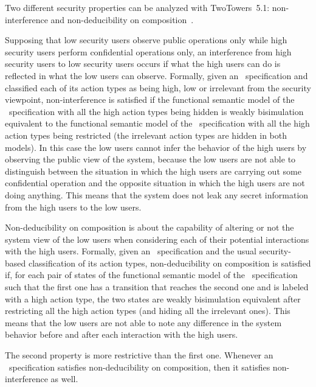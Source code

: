 Two different security properties can be analyzed with TwoTowers~5.1: non-interference and non-deducibility
on composition~\cite{FG}.

Supposing that low security users observe public operations only while high security users perform
confidential operations only, an interference from high security users to low security users occurs if what
the high users can do is reflected in what the low users can observe. Formally, given an \aemilia\
specification and classified each of its action types as being high, low or irrelevant from the security
viewpoint, non-interference is satisfied if the functional semantic model of the \aemilia\ specification
with all the high action types being hidden is weakly bisimulation equivalent to the functional semantic
model of the \aemilia\ specification with all the high action types being restricted (the irrelevant action
types are hidden in both models). In this case the low users cannot infer the behavior of the high users by
observing the public view of the system, because the low users are not able to distinguish between the
situation in which the high users are carrying out some confidential operation and the opposite situation in
which the high users are not doing anything. This means that the system does not leak any secret information
from the high users to the low users.

Non-deducibility on composition is about the capability of altering or not the system view of the low users
when considering each of their potential interactions with the high users. Formally, given an \aemilia\
specification and the usual security-based classification of its action types, non-deducibility on
composition is satisfied if, for each pair of states of the functional semantic model of the \aemilia\
specification such that the first one has a transition that reaches the second one and is labeled with a
high action type, the two states are weakly bisimulation equivalent after restricting all the high action
types (and hiding all the irrelevant ones). This means that the low users are not able to note any
difference in the system behavior before and after each interaction with the high users.

The second property is more restrictive than the first one. Whenever an \aemilia\ specification satisfies
non-deducibility on composition, then it satisfies non-interference as well.



